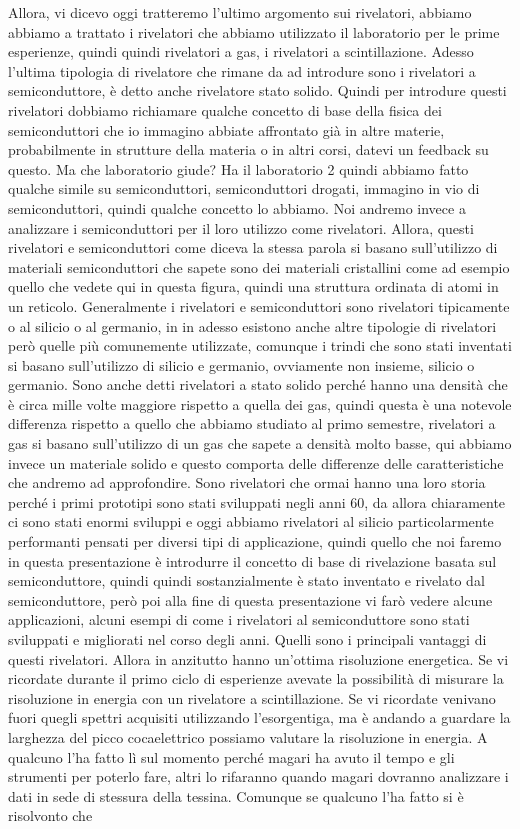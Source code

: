Allora, vi dicevo oggi tratteremo l'ultimo argomento sui rivelatori, abbiamo abbiamo a trattato i rivelatori che abbiamo utilizzato il laboratorio per le prime esperienze, quindi quindi rivelatori a gas, i rivelatori a scintillazione. Adesso l'ultima tipologia di rivelatore che rimane da ad introdure sono i rivelatori a semiconduttore, è detto anche rivelatore stato solido. Quindi per introdure questi rivelatori dobbiamo richiamare qualche concetto di base della fisica dei semiconduttori che io immagino abbiate affrontato già in altre materie, probabilmente in strutture della materia o in altri corsi, datevi un feedback su questo. Ma che laboratorio giude? Ha il laboratorio 2 quindi abbiamo fatto qualche simile su semiconduttori, semiconduttori drogati, immagino in vio di semiconduttori, quindi qualche concetto lo abbiamo. Noi andremo invece a analizzare i semiconduttori per il loro utilizzo come rivelatori. Allora, questi rivelatori e semiconduttori come diceva la stessa parola si basano sull'utilizzo di materiali semiconduttori che sapete sono dei materiali cristallini come ad esempio quello che vedete qui in questa figura, quindi una struttura ordinata di atomi in un reticolo. Generalmente i rivelatori e semiconduttori sono rivelatori tipicamente o al silicio o al germanio, in in adesso esistono anche altre tipologie di rivelatori però quelle più comunemente utilizzate, comunque i trindi che sono stati inventati si basano sull'utilizzo di silicio e germanio, ovviamente non insieme, silicio o germanio. Sono anche detti rivelatori a stato solido perché hanno una densità che è circa mille volte maggiore rispetto a quella dei gas, quindi questa è una notevole differenza rispetto a quello che abbiamo studiato al primo semestre, rivelatori a gas si basano sull'utilizzo di un gas che sapete a densità molto basse, qui abbiamo invece un materiale solido e questo comporta delle differenze delle caratteristiche che andremo ad approfondire. Sono rivelatori che ormai hanno una loro storia perché i primi prototipi sono stati sviluppati negli anni 60, da allora chiaramente ci sono stati enormi sviluppi e oggi abbiamo rivelatori al silicio particolarmente performanti pensati per diversi tipi di applicazione, quindi quello che noi faremo in questa presentazione è introdurre il concetto di base di rivelazione basata sul semiconduttore, quindi quindi sostanzialmente è stato inventato e rivelato dal semiconduttore, però poi alla fine di questa presentazione vi farò vedere alcune applicazioni, alcuni esempi di come i rivelatori al semiconduttore sono stati sviluppati e migliorati nel corso degli anni. Quelli sono i principali vantaggi di questi rivelatori. Allora in anzitutto hanno un'ottima risoluzione energetica. Se vi ricordate durante il primo ciclo di esperienze avevate la possibilità di misurare la risoluzione in energia con un rivelatore a scintillazione. Se vi ricordate venivano fuori quegli spettri acquisiti utilizzando l'esorgentiga, ma è andando a guardare la larghezza del picco cocaelettrico possiamo valutare la risoluzione in energia. A qualcuno l'ha fatto lì sul momento perché magari ha avuto il tempo e gli strumenti per poterlo fare, altri lo rifaranno quando magari dovranno analizzare i dati in sede di stessura della tessina. Comunque se qualcuno l'ha fatto si è risolvonto che 